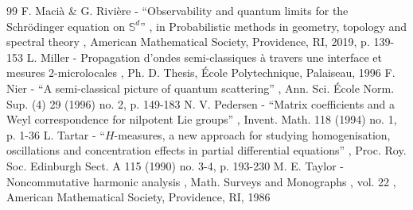 \documentclass[10pt]{amsart}
\theoremstyle{plain}
\theoremstyle{definition}
\begin{document}
\begin{thebibliography}{99}
 F. Macià \& G. Rivière - “Observability and quantum limits for the Schrödinger equation on $\mathbb{S}^d$” , in Probabilistic methods in geometry, topology and spectral theory , American Mathematical Society, Providence, RI, 2019, p. 139-153
 L. Miller - Propagation d’ondes semi-classiques à travers une interface et mesures 2-microlocales , Ph. D. Thesis, École Polytechnique, Palaiseau, 1996
 F. Nier - “A semi-classical picture of quantum scattering” , Ann. Sci. École Norm. Sup. (4) 29 (1996) no. 2, p. 149-183
 N. V. Pedersen - “Matrix coefficients and a Weyl correspondence for nilpotent Lie groups” , Invent. Math. 118 (1994) no. 1, p. 1-36
 L. Tartar - “$H$-measures, a new approach for studying homogenisation, oscillations and concentration effects in partial differential equations” , Proc. Roy. Soc. Edinburgh Sect. A 115 (1990) no. 3-4, p. 193-230
 M. E. Taylor - Noncommutative harmonic analysis , Math. Surveys and Monographs , vol. 22 , American Mathematical Society, Providence, RI, 1986
\end{thebibliography}
\end{document}
